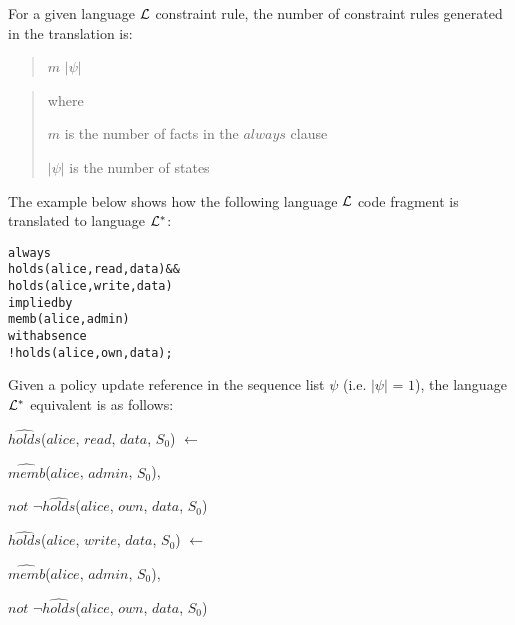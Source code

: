 \documentclass[global,twocolumn,final]{svjour}
\newenvironment{vquote}
  {\begin{list}{}{\leftmargin 1em}\item[]}
  {\end{list}}
\newenvironment{vverbatim}
  {\begin{alltt}}
  {\vspace{-\baselineskip}\end{alltt}}
\begin{document}
          For a given language ${\cal L}$ constraint rule, the number of
          constraint rules generated in the translation is:

          \begin{quote}
            $m$ $|\psi|$
          \end{quote}

          \begin{quote}
            where

            $m$ is the number of facts in the $always$ clause

            $|\psi|$ is the number of states
          \end{quote}

          The example below shows how the following language ${\cal L}$ code
          fragment is translated to language ${\cal L}^{*}$:

          \begin{vverbatim}
  always
    holds(alice, read, data) &&
    holds(alice, write, data)
  implied by
    memb(alice, admin)
  with absence
    !holds(alice, own, data);
          \end{vverbatim}

          Given a policy update reference in the sequence list $\psi$ (i.e.
          $|\psi|$ = $1$), the language ${\cal L}^{*}$ equivalent is as
          follows:

          \begin{vquote}
            $\hat{holds}$($alice$, $read$, $data$, $S_{0}$) $\leftarrow$

            \hspace{1em}
            $\hat{memb}$($alice$, $admin$, $S_{0}$),

            \hspace{1em}
            $not$ $\lnot\hat{holds}$($alice$, $own$, $data$, $S_{0}$)

            $\hat{holds}$($alice$, $write$, $data$, $S_{0}$) $\leftarrow$

            \hspace{1em}
            $\hat{memb}$($alice$, $admin$, $S_{0}$),

            \hspace{1em}
            $not$ $\lnot\hat{holds}$($alice$, $own$, $data$, $S_{0}$)
          \end{vquote}
\end{document}
